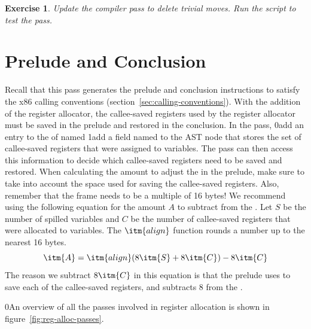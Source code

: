 \documentclass[7x10]{TimesAPriori_MIT}%
\def\racketEd{0}
\def\pythonEd{1}
\def\edition{0}
\newcommand{\racket}[1]{{\if\edition\racketEd{#1}\fi}}
\newcommand{\python}[1]{{\if\edition\pythonEd #1\fi}}
\newtheorem{exercise}[theorem]{Exercise}
\numberwithin{theorem}{chapter}
\numberwithin{definition}{chapter}
\numberwithin{equation}{chapter}
\begin{document}
\begin{exercise}\normalfont\normalsize
%
Update the  compiler pass to delete trivial moves.
%
%
Run the script to test the  pass.
\end{exercise}


\section{Prelude and Conclusion}
\label{sec:print-x86-reg-alloc}

Recall that this pass generates the prelude and conclusion
instructions to satisfy the x86 calling conventions
(section~\ref{sec:calling-conventions}). With the addition of the
register allocator, the callee-saved registers used by the register
allocator must be saved in the prelude and restored in the conclusion.
In the  pass,
%
\racket{add an entry to the 
  of  named }
%
\python{add a field named \code{used\_callee} to the \code{X86Program} AST node}
%
that stores the set of callee-saved registers that were assigned to
variables. The  pass can then access
this information to decide which callee-saved registers need to be
saved and restored.
%
When calculating the amount to adjust the  in the prelude,
make sure to take into account the space used for saving the
callee-saved registers. Also, remember that the frame needs to be a
multiple of 16 bytes! We recommend using the following equation for
the amount $A$ to subtract from the . Let $S$ be the number
of spilled variables and $C$ be the number of callee-saved registers
that were allocated to variables. The $\itm{align}$ function rounds a
number up to the nearest 16 bytes.
\[
   \itm{A} = \itm{align}(8\itm{S} + 8\itm{C}) - 8\itm{C}
\]
The reason we subtract $8\itm{C}$ in this equation is that the
prelude uses  to save each of the callee-saved registers,
and  subtracts $8$ from the .

\racket{An overview of all the passes involved in register
  allocation is shown in figure~\ref{fig:reg-alloc-passes}.}
\end{document}
